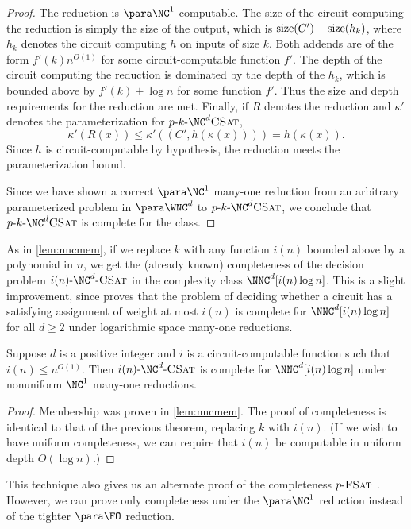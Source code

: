 \begin{proof}
  The reduction is $\para \NC^1$-computable.
  The size of the circuit computing the reduction is simply the size of the output, which is $\operatorname{size}(C') + \operatorname{size}(h_k)$, where $h_k$ denotes the circuit computing $h$ on inputs of size $k$.
  Both addends are of the form $f'(k) n^{O(1)}$ for some circuit-computable function $f'$.
  The depth of the circuit computing the reduction is dominated by the depth of the $h_k$, which is bounded above by $f'(k) + \log n$ for some function $f'$.
  Thus the size and depth requirements for the reduction are met.
  Finally, if $R$ denotes the reduction and $\kappa'$ denotes the parameterization for $\pNCSAT$,
  \[
  \kappa'(R(x)) \leq \kappa'((C', h(\kappa(x)))) = h(\kappa(x)).
  \]
  Since $h$ is circuit-computable by hypothesis, the reduction meets the parameterization bound.

  Since we have shown a correct $\para \NC^1$ many-one reduction from an arbitrary parameterized problem in $\para \WNC^d$ to $\pNCSAT$, we conclude that $\pNCSAT$ is complete for the class.
\end{proof}

As in \autoref{lem:nncmem}, if we replace $k$ with any function $i(n)$ bounded above by a polynomial in $n$, we get the (already known) completeness of the decision problem $\iNCSAT$ in the complexity class $\NNC^d[i(n) \log n]$.
This is a slight improvement, since \autocite[Theorem~3.6]{cc97lim} proves that the problem of deciding whether a circuit has a satisfying assignment of weight at most $i(n)$ is complete for $\NNC^d[i(n) \log n]$ for all $d \geq 2$ under logarithmic space many-one reductions.

\begin{corollary}\label{cor:nnccomplete}
  Suppose $d$ is a positive integer and $i$ is a circuit-computable function such that $i(n) \leq n^{O(1)}$.
  Then $\iNCSAT$ is complete for $\NNC^d[i(n) \log n]$ under nonuniform $\NC^1$ many-one reductions.
\end{corollary}
\begin{proof}
  Membership was proven in \autoref{lem:nncmem}.
  The proof of completeness is identical to that of the previous theorem, replacing $k$ with $i(n)$.
  (If we wish to have uniform completeness, we can require that $i(n)$ be computable in uniform depth $O(\log n)$.)
\end{proof}

This technique also gives us an alternate proof of the completeness $p \textnormal{-} \textsc{FSat}$ \autocite[Theorem~3.6]{est15}.
However, we can prove only completeness under the $\para \NC^1$ reduction instead of the tighter $\para \FO$ reduction.

